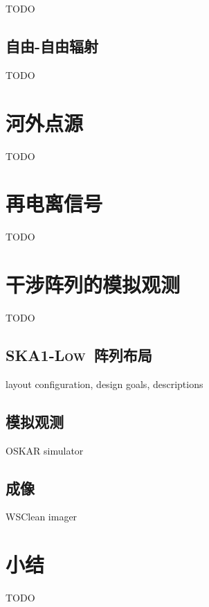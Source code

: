 TODO

\subsection{自由-自由辐射}

TODO


\section{河外点源}

TODO


\section{再电离信号}

TODO


\section{干涉阵列的模拟观测}

TODO

\subsection{\textsc{SKA1-Low}~阵列布局}

layout configuration, design goals, descriptions

\subsection{模拟观测}

OSKAR simulator

\subsection{成像}

WSClean imager


\section{小结}

TODO


